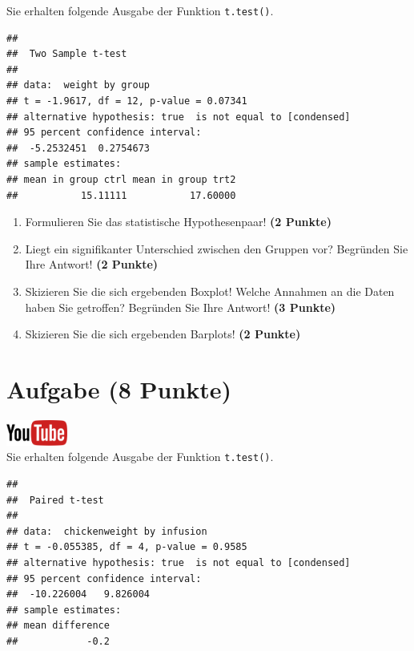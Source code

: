 \documentclass[a4paper, 9pt]{scrartcl}\usepackage[]{graphicx}\usepackage[]{xcolor}
\makeatletter
\newenvironment{kframe}{%
 \def\at@end@of@kframe{}%
 \ifinner\ifhmode%
  \def\at@end@of@kframe{\end{minipage}}%
  \begin{minipage}{\columnwidth}%
 \fi\fi%
 \def\FrameCommand##1{\hskip\@totalleftmargin \hskip-\fboxsep
 \colorbox{shadecolor}{##1}\hskip-\fboxsep
     \hskip-\linewidth \hskip-\@totalleftmargin \hskip\columnwidth}%
 \MakeFramed {\advance\hsize-\width
   \@totalleftmargin\z@ \linewidth\hsize
   \@setminipage}}%
 {\par\unskip\endMakeFramed%
 \at@end@of@kframe}
\newenvironment{knitrout}{}{} %
\makeatother
\begin{document}
Sie erhalten folgende \Rlogo Ausgabe der Funktion \texttt{t.test()}.

\begin{knitrout}
\color{fgcolor}\begin{kframe}
\begin{verbatim}
## 
## 	Two Sample t-test
## 
## data:  weight by group
## t = -1.9617, df = 12, p-value = 0.07341
## alternative hypothesis: true  is not equal to [condensed]
## 95 percent confidence interval:
##  -5.2532451  0.2754673
## sample estimates:
## mean in group ctrl mean in group trt2 
##           15.11111           17.60000
\end{verbatim}
\end{kframe}
\end{knitrout}


\begin{enumerate}
  \item Formulieren Sie das statistische Hypothesenpaar! \textbf{(2
Punkte)}
\item Liegt ein signifikanter Unterschied zwischen den Gruppen vor?
  Begr{\"u}nden Sie Ihre Antwort! \textbf{(2 Punkte)}
\item Skizieren Sie die sich ergebenden Boxplot!
  Welche Annahmen an die Daten haben Sie getroffen? Begr{\"u}nden Sie Ihre
  Antwort! \textbf{(3 Punkte)} 
\item Skizieren Sie die sich ergebenden Barplots! \textbf{(2 Punkte)} 
\end{enumerate}
 
\clearpage

\section{Aufgabe \hfill (8 Punkte)}

\hfill\href{https://youtu.be/kHmfEmU6lrk}{\includegraphics[width =
  2cm]{img/youtube}}\\[1Ex]


Sie erhalten folgende \Rlogo Ausgabe der Funktion \texttt{t.test()}.

\begin{knitrout}
\color{fgcolor}\begin{kframe}
\begin{verbatim}
## 
## 	Paired t-test
## 
## data:  chickenweight by infusion
## t = -0.055385, df = 4, p-value = 0.9585
## alternative hypothesis: true  is not equal to [condensed]
## 95 percent confidence interval:
##  -10.226004   9.826004
## sample estimates:
## mean difference 
##            -0.2
\end{verbatim}
\end{kframe}
\end{knitrout}
\end{document}
